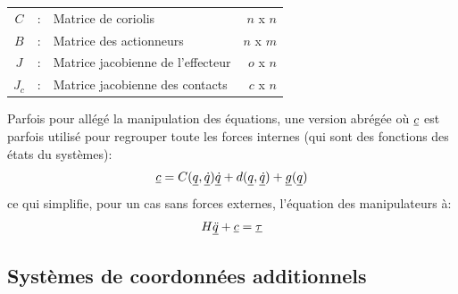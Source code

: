 \begin{table}[htbp]
\begin{tabular}{ c c l r }
			$C$             &  :  & Matrice de coriolis                       & $n$ x $n$ \\
			$B$             &  :  & Matrice des actionneurs                                & $n$ x $m$ \\
			$J$             &  :  & Matrice jacobienne de l'effecteur & $o$ x $n$ \\
			$J_c$           &  :  & Matrice jacobienne des contacts                        & $c$ x $n$  \\
		\hline \hline
        \end{tabular}		
	\label{tab:nom}
\end{table}

Parfois pour allégé la manipulation des équations, une version abrégée où $\underline{c}$ est parfois utilisé pour regrouper toute les forces internes (qui sont des fonctions des états du systèmes):
\begin{align}
\underline{c} = C(\underline{q},\underline{\dot{q}}) \underline{\dot{q}} + d(\underline{q}, \underline{\dot{q}}) + \underline{g}(\underline{q})
\end{align}
ce qui simplifie, pour un cas sans forces externes, l'équation des manipulateurs à:
\begin{align}
H \underline{\ddot{q}} + \underline{c} = \underline{\tau} 
\label{eq:manipulator_short}
\end{align}





\subsection{Systèmes de coordonnées additionnels}
\label{sec:coord}

